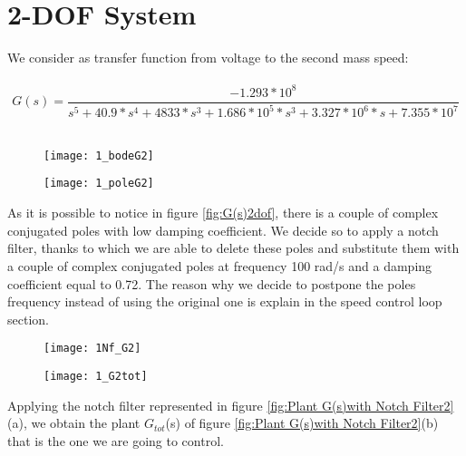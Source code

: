 \section{2-DOF System}
We consider as transfer function from voltage to the second mass speed:\\
\\
\[	
G(s)=
\frac{-1.293*10^{8}}{s^5+40.9*s^{4}+4833*s^{3}+1.686*10^{5}*s^{3}+3.327*10^{6}*s+7.355*10^{7}}
\]
\\



\begin{figure*}[h]
	\centering
	\begin{subfigure}{0.4\columnwidth}
		\texttt{[image: 1\_bodeG2]}
	\end{subfigure}
	\begin{subfigure}{0.4\columnwidth}
		\texttt{[image: 1\_poleG2]}
	\end{subfigure}
	\caption{G(s)}
	\label{fig:G(s)2dof}
\end{figure*}

As it is possible to notice in figure \ref{fig:G(s)2dof}, there is a couple of complex conjugated poles with low damping coefficient. We decide so to apply a notch filter, thanks to which we are able to delete these poles and substitute them with a couple of complex conjugated poles at frequency 100 rad/s and a damping coefficient equal to 0.72. The reason why we decide to postpone the poles frequency instead of using the original one is explain in the speed control loop section.


\begin{figure*}[h]
	\centering
	\begin{subfigure}{0.35\columnwidth}
		\texttt{[image: 1Nf\_G2]}
	\end{subfigure}
	\begin{subfigure}{0.35\columnwidth}
		\texttt{[image: 1\_G2tot]}
	\end{subfigure}
	\caption{Plant G(s) with Notch Filter Nf(s): $G_{tot}$(s)}
	\label{fig:Plant G(s)with Notch Filter2}
\end{figure*}


Applying the notch filter represented in figure \ref{fig:Plant G(s)with Notch Filter2}(a), we obtain the plant $G_{tot}$(s) of figure \ref{fig:Plant G(s)with Notch Filter2}(b) that is the one we are going to control.

